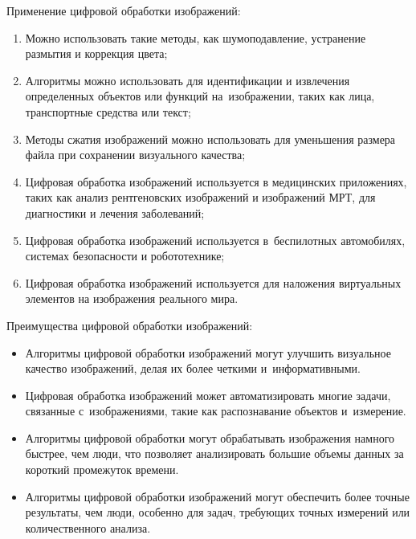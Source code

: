 \documentclass{ou}
\begin{document}
Применение цифровой обработки изображений:
\begin{enumerate}[leftmargin=0em, itemindent=3.75em, nosep, label=\arabic*)]
\item Можно использовать такие методы, как шумоподавление, устранение размытия и коррекция цвета;
\item Алгоритмы можно использовать для идентификации и извлечения определенных объектов или функций на~изображении, таких как лица, транспортные средства или текст;
\item Методы сжатия изображений можно использовать для уменьшения размера файла при сохранении визуального качества;
\item Цифровая обработка изображений используется в медицинских приложениях, таких как анализ рентгеновских изображений и изображений МРТ, для диагностики и лечения заболеваний;
\item Цифровая обработка изображений используется в~беспилотных автомобилях, системах безопасности и робототехнике;
\item Цифровая обработка изображений используется для наложения виртуальных элементов на изображения реального мира\cite{сyberleninka}.
\end{enumerate}

Преимущества цифровой обработки изображений:
\begin{itemize}[label=-, leftmargin=0em, itemindent=3.35em, nosep]
\item Алгоритмы цифровой обработки изображений могут улучшить визуальное качество изображений, делая их более четкими и~информативными.
\item Цифровая обработка изображений может автоматизировать многие задачи, связанные с~изображениями, такие как распознавание объектов и~измерение.
\item Алгоритмы цифровой обработки могут обрабатывать изображения намного быстрее, чем люди, что позволяет анализировать большие объемы данных за короткий промежуток времени.
\item Алгоритмы цифровой обработки изображений могут обеспечить более точные результаты, чем люди, особенно для задач, требующих точных измерений или количественного анализа\cite{Department_of_Nanosystems_and_Optotechnology2022}.
\end{itemize}
\end{document}
